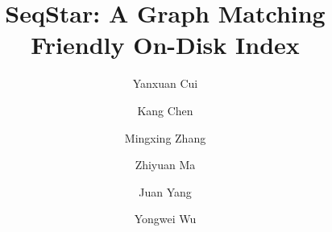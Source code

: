 \documentclass[letterpaper,twocolumn,10pt]{article}
\begin{document}
\date{}
\title{SeqStar: A Graph Matching Friendly On-Disk Index}

\author[1]{\rm Yanxuan Cui}
\author[1]{\rm Kang Chen}
\author[1,2]{\rm Mingxing Zhang}
\author[1]{\rm Zhiyuan Ma}
\author[3]{\rm Juan Yang}
\author[1]{\rm Yongwei Wu}


\maketitle












\end{document}

